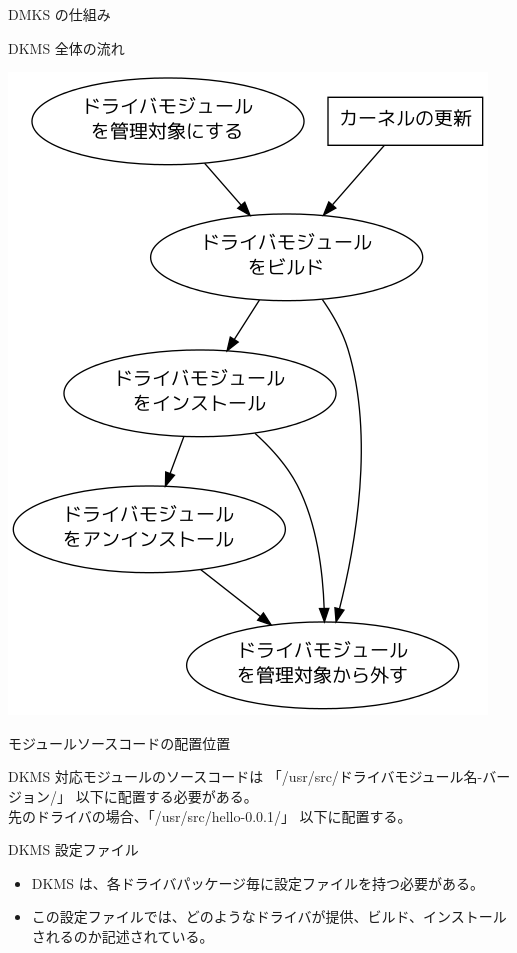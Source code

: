 \begin{frame}
\large\bfseries
\begin{center}
DMKS の仕組み
\end{center}
\end{frame}

\begin{frame}{DKMS 全体の流れ}

\begin{center}
  \includegraphics[width=0.5\hsize]{image201202/dkms0.png}
\end{center}

\end{frame}

\begin{frame}[containsverbatim]{モジュールソースコードの配置位置}

DKMS 対応モジュールのソースコードは
「/usr/src/ドライバモジュール名-バージョン/」 以下に配置する必要がある。\\
先のドライバの場合、「/usr/src/hello-0.0.1/」 以下に配置する。

\end{frame}

\begin{frame}{DKMS 設定ファイル}

\begin{itemize}
\item DKMS は、各ドライバパッケージ毎に設定ファイルを持つ必要がある。
\item この設定ファイルでは、どのようなドライバが提供、ビルド、インストールされるのか記述されている。
\end{itemize}

\end{frame}

